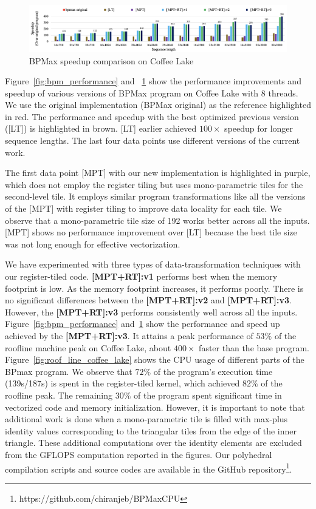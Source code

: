 \begin{figure}[htbp]
\centerline{\includegraphics[width=\textwidth,scale=1.00, trim=5 5 5 5,clip]{content/figures/bpm_speed_up_new_tile.png}} 
\caption{BPMax speedup comparison on Coffee Lake}
\label{fig:bpm_speed_up}
\end{figure}
Figure~\ref{fig:bpm_performance} and ~\ref{fig:bpm_speed_up} show the performance improvements and speedup of various versions of BPMax program on Coffee Lake with $8$ threads. We use the original implementation (BPMax original) as the reference highlighted in red. 
The performance and speedup with the best optimized previous version \cite{Mondal2021} ([LT]) is highlighted in brown. [LT] earlier achieved  $100\times$ speedup for longer sequence lengths. The last four data points use different versions of the current work.

The first data point [MPT] with our new implementation is highlighted in purple, which does not employ the register tiling but uses mono-parametric tiles for the second-level tile. It employs similar program transformations like all the versions of the [MPT] with register tiling to improve data locality for each tile. We observe that a mono-parametric tile size of 192 works better across all the inputs. [MPT] shows no performance improvement over [LT] because the best tile size was not long enough for effective vectorization.

We have experimented with three types of data-transformation techniques with our register-tiled code. \textbf{[MPT+RT]:v1} performs best when the memory footprint is low. As the memory footprint increases, it performs poorly. There is no significant differences between the \textbf{[MPT+RT]:v2} and \textbf{[MPT+RT]:v3}. However, the \textbf{[MPT+RT]:v3} performs consistently well across all the inputs. Figure~\ref{fig:bpm_performance} and~\ref{fig:bpm_speed_up} show the performance and speed up achieved by the \textbf{[MPT+RT]:v3}. It attains a peak performance of $53\%$ of the roofline machine peak on Coffee Lake, about $400\times$ faster than the base program. Figure~\ref{fig:roof_line_coffee_lake} shows the CPU usage of different parts of the BPmax program. We observe that $72\%$ of the program's execution time (139s/187s) is spent in the register-tiled kernel, which achieved $82\%$ of the roofline peak. The remaining $30\%$ of the program spent significant time in vectorized code and memory initialization. However, it is important to note that additional work is done when a mono-parametric tile is filled with max-plus identity values corresponding to the triangular tiles from the edge of the inner triangle. These additional computations over the identity elements are excluded from the GFLOPS computation reported in the figures. Our polyhedral compilation scripts and source codes are available in the GitHub repository\footnote{https://github.com/chiranjeb/BPMaxCPU}.
